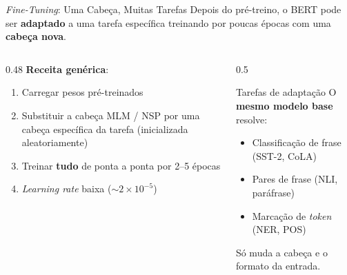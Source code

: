 \documentclass[aspectratio=169, xcolor=dvipsnames]{beamer}
\begin{document}
  \begin{frame}{\textit{Fine-Tuning}: Uma Cabeça, Muitas Tarefas}
    Depois do pré-treino, o BERT pode ser \textbf{adaptado} a uma tarefa específica treinando por poucas épocas com uma \textbf{cabeça nova}.

    \vspace{0.4em}
    \begin{columns}[T]
      \begin{column}{0.48\textwidth}
        \textbf{Receita genérica}:
        \begin{enumerate}
          \item Carregar pesos pré-treinados
          \item Substituir a cabeça MLM / NSP por uma cabeça específica da tarefa (inicializada aleatoriamente)
          \item Treinar \textbf{tudo} de ponta a ponta por 2--5 épocas
          \item \textit{Learning rate} baixa ($\sim 2 \times 10^{-5}$)
        \end{enumerate}
      \end{column}
      \begin{column}{0.5\textwidth}
        \begin{alertblock}{Tarefas de adaptação}
          O \textbf{mesmo modelo base} resolve:
          \begin{itemize}
            \item Classificação de frase (SST-2, CoLA)
            \item Pares de frase (NLI, paráfrase)
            \item Marcação de \textit{token} (NER, POS)
          \end{itemize}
          Só muda a cabeça e o formato da entrada.
        \end{alertblock}
      \end{column}
    \end{columns}
  \end{frame}
\end{document}
